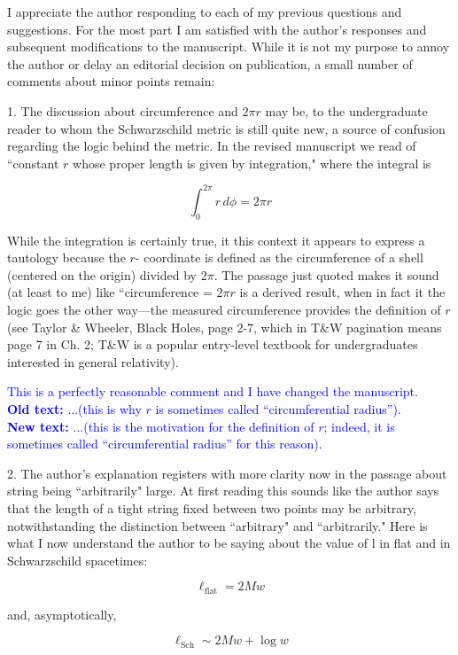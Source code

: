 \documentclass[12pt]{article}
\begin{document}
I appreciate the author responding to each of my previous questions
and suggestions. For the most part I am satisfied with the author’s
responses and subsequent modifications to the manuscript. While it is
not my purpose to annoy the author or delay an editorial decision on
publication, a small number of comments about minor points remain:

1. The discussion about circumference and $2\pi r$ may be, to the
undergraduate reader to whom the Schwarzschild metric is still quite
new, a source of confusion regarding the logic behind the metric. In
the revised manuscript we read of ``constant $r$ whose proper length
is given by integration," where the integral is

\[
\int_{0}^{2\pi} r\,d\phi = 2\pi r
\]


While the integration is certainly true, it this context it appears to
express a tautology because the $r$- coordinate is defined as the
circumference of a shell (centered on the origin) divided by $2\pi$.
The passage just quoted makes it sound (at least to me) like
``circumference = $2\pi r$ is a derived result, when in fact it the
logic goes the other way---the measured circumference provides the
definition of $r$ (see Taylor \& Wheeler, Black Holes, page 2-7, which
in T\&W pagination means page 7 in Ch. 2; T\&W is a popular
entry-level textbook for undergraduates interested in general
relativity).

\textcolor{blue}{This is a perfectly reasonable comment and 
  I have changed the manuscript.\\
{\bf Old text:}
 ...(this is why $r$ is sometimes called ``circumferential radius'').\\
{\bf New text:} ...(this is the motivation for the definition of $r$;
indeed, it is  sometimes called ``circumferential radius'' for this
reason).
}

2. The author's explanation registers with more clarity now in the
passage about string being ``arbitrarily" large.  At first reading
this sounds like the author says that the length of a tight string
fixed between two points may be arbitrary, notwithstanding the
distinction between ``arbitrary" and ``arbitrarily."  Here is what I
now understand the author to be saying about the value of l in flat
and in Schwarzschild spacetimes:

\[
\ell_\mathrm{flat} = 2Mw
\]

and, asymptotically,

\[
\ell_\mathrm{Sch}\sim 2Mw + \log w
\]
\end{document}
